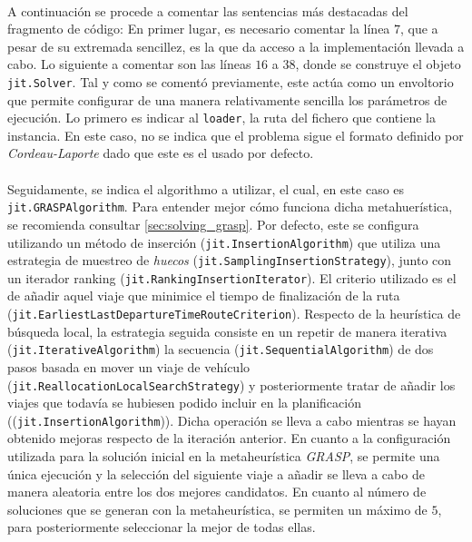 \documentclass{subfiles}
\begin{document}
        \paragraph{}
        A continuación se procede a comentar las sentencias más destacadas del fragmento de código: En primer lugar, es necesario comentar la línea $7$, que a pesar de su extremada sencillez, es la que da acceso a la implementación llevada a cabo. Lo siguiente a comentar son las líneas $16$ a $38$, donde se construye el objeto \texttt{jit.Solver}. Tal y como se comentó previamente, este actúa como un envoltorio que permite configurar de una manera relativamente sencilla los parámetros de ejecución. Lo primero es indicar al \texttt{loader}, la ruta del fichero que contiene la instancia. En este caso, no se indica que el problema sigue el formato definido por \emph{Cordeau-Laporte} dado que este es el usado por defecto.

        \paragraph{}
        Seguidamente, se indica el algorithmo a utilizar, el cual, en este caso es \texttt{jit.GRASPAlgorithm}. Para entender mejor cómo funciona dicha metahuerística, se recomienda consultar \cref{sec:solving_grasp}. Por defecto, este se configura utilizando un método de inserción (\texttt{jit.InsertionAlgorithm}) que utiliza una estrategia de muestreo de \emph{huecos} (\texttt{jit.SamplingInsertionStrategy}), junto con un iterador ranking (\texttt{jit.RankingInsertionIterator}). El criterio utilizado es el de añadir aquel viaje que minimice el tiempo de finalización de la ruta (\texttt{jit.EarliestLastDepartureTimeRouteCriterion}). Respecto de la heurística de búsqueda local, la estrategia seguida consiste en un repetir de manera iterativa (\texttt{jit.IterativeAlgorithm}) la secuencia (\texttt{jit.SequentialAlgorithm}) de dos pasos basada en mover un viaje de vehículo (\texttt{jit.ReallocationLocalSearchStrategy}) y posteriormente tratar de añadir los viajes que todavía se hubiesen podido incluir en la planificación ((\texttt{jit.InsertionAlgorithm})). Dicha operación se lleva a cabo mientras se hayan obtenido mejoras respecto de la iteración anterior. En cuanto a la configuración utilizada para la solución inicial en la metaheurística \emph{GRASP}, se permite una única ejecución y la selección del siguiente viaje a añadir se lleva a cabo de manera aleatoria entre los dos mejores candidatos. En cuanto al número de soluciones que se generan con la metaheurística, se permiten un máximo de $5$, para posteriormente seleccionar la mejor de todas ellas.
\end{document}
